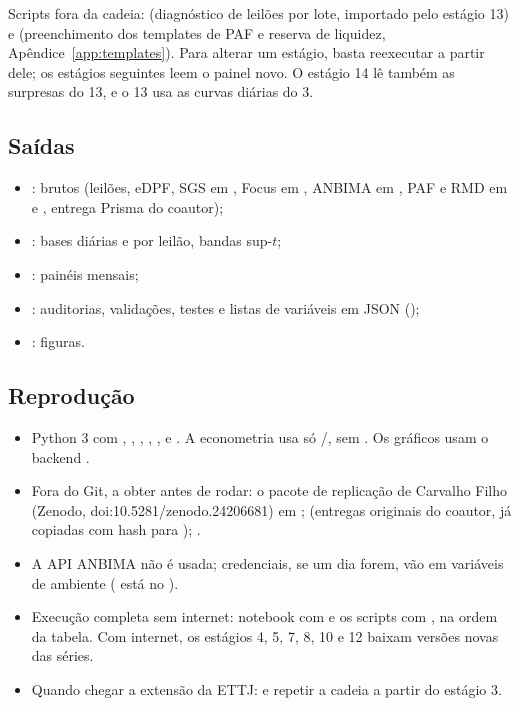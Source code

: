\documentclass[12pt,a4paper]{article}
\begin{document}
Scripts fora da cadeia:  (diagnóstico de leilões
por lote, importado pelo estágio 13) e 
(preenchimento dos templates de PAF e reserva de liquidez, Apêndice~\ref{app:templates}).
Para alterar um estágio, basta reexecutar a partir dele; os estágios seguintes leem
o painel novo. O estágio 14 lê também as surpresas do 13, e o 13 usa as curvas
diárias do 3.

\subsection{Saídas}

\begin{itemize}[leftmargin=1.2cm]
    \item {}: brutos (leilões, eDPF, SGS em , Focus em
    , ANBIMA em , PAF e RMD em  e
    , entrega Prisma do coautor);
    \item {}: bases diárias e por leilão, bandas sup-\(t\);
    \item {}: painéis mensais;
    \item {}: auditorias, validações, testes e listas de
    variáveis em JSON ();
    \item {}: figuras.
\end{itemize}

\subsection{Reprodução}

\begin{itemize}[leftmargin=1.2cm]
    \item Python 3 com , , , ,
    ,  e . A econometria usa só
    /, sem . Os gráficos usam o backend
    .
    \item Fora do Git, a obter antes de rodar: o pacote de replicação de Carvalho
    Filho (Zenodo, doi:10.5281/zenodo.24206681) em
    ;  (entregas
    originais do coautor, já copiadas com hash para );
    .
    \item A API ANBIMA não é usada; credenciais, se um dia forem, vão em variáveis
    de ambiente ( está no ).
    \item Execução completa sem internet: notebook com  e os
    scripts com , na ordem da tabela. Com internet, os estágios 4,
    5, 7, 8, 10 e 12 baixam versões novas das séries.
    \item Quando chegar a extensão da ETTJ:
     e repetir a cadeia a
    partir do estágio 3.
\end{itemize}
\end{document}

